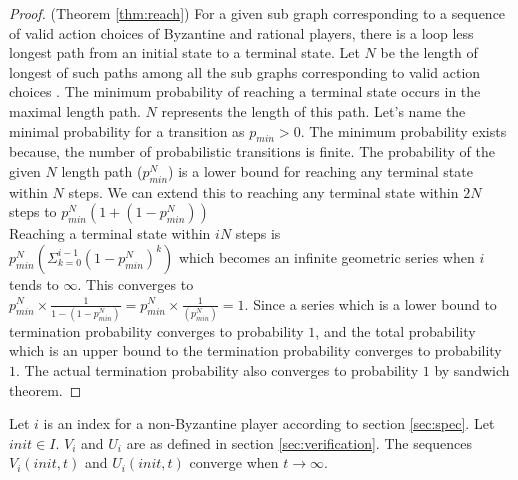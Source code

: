 \begin{proof}(Theorem \ref{thm:reach})
 For a given sub graph corresponding to a sequence of valid action choices of Byzantine and rational players, there is a loop less longest path from an initial state to a terminal state.  Let $N$ be the length of longest of such paths among all the sub graphs corresponding to valid action choices . The minimum probability of reaching a terminal state occurs in the maximal length path. $N$ represents the length of this path. Let's name the minimal probability for a transition as $p_{min}>0$. The minimum probability exists because, the number of probabilistic transitions is finite. The probability of the given $N$ length path ($p_{min}^N$) is a lower bound for reaching any terminal state within $N$ steps. We can extend this to reaching any terminal state within $2N$ steps to $p_{min}^N(1+(1-p_{min}^N))$\\
Reaching a terminal state within $iN$ steps is\\ $p_{min}^N(\Sigma_{k=0}^{i-1}(1-p_{min}^N)^k)$ which becomes an infinite geometric series when $i$ tends to $\infty$. This converges to\\
 $p_{min}^N \times \frac{1}{1-(1-p_{min}^N)}= p_{min}^N \times \frac{1}{(p_{min}^N)}=1$. Since a series which is a lower bound to termination probability converges to probability $1$, and the total probability which is an upper bound to the termination probability converges to probability $1$. The actual termination probability also converges to probability $1$ by sandwich theorem.
\end{proof}


\begin{theorem}
	Let $i$ is an index for a non-Byzantine player according to section \ref{sec:spec}. Let $init \in I$. $V_i$ and $U_i$ are as defined in section \ref{sec:verification}.
	The sequences  $V_i(init,t)$ and $U_i(init,t)$ converge when $t \rightarrow \infty$.
\end{theorem}

